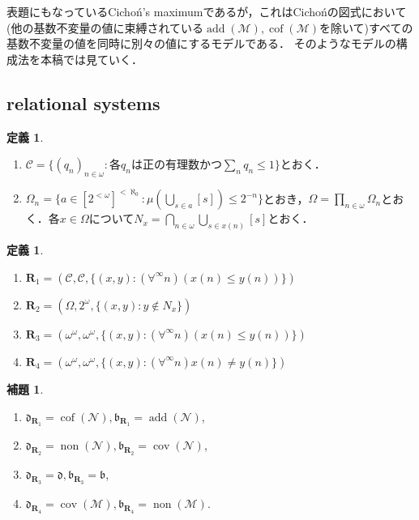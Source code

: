 \documentclass[uplatex,dvipdfmx]{jsarticle}
\newcommand{\non}{\operatorname{non}}
\newcommand{\cov}{\operatorname{cov}}
\newcommand{\add}{\operatorname{add}}
\newcommand{\cof}{\operatorname{cof}}
\newcommand{\nul}{\mathcal{N}}
\newcommand{\meager}{\mathcal{M}}
\newcommand{\frakb}{\mathfrak{b}}
\newcommand{\frakd}{\mathfrak{d}}
\newcommand{\relR}{\mathbf{R}}
\theoremstyle{definition}
\newtheorem{defi}[thm]{定義}
\newtheorem{lem}[thm]{補題}
\begin{document}
	表題にもなっているCichoń's maximumであるが，これはCichońの図式において (他の基数不変量の値に束縛されている$\add(\meager), \cof(\meager)$を除いて)すべての基数不変量の値を同時に別々の値にするモデルである．
	そのようなモデルの構成法を本稿では見ていく．
	
	\subsection{relational systems}
	
	\begin{defi}
		\begin{enumerate}
			\item $\mathcal{C} = \{ (q_n)_{n \in \omega}	 : \text{各}q_n\text{は正の有理数かつ} \sum_n q_n \le 1 \}$とおく．
			\item $\Omega_n = \{ a \in [2^{<\omega}]^{<\aleph_0} : \mu(\bigcup_{s \in a} [s]) \le 2^{-n} \}$とおき，$\Omega = \prod_{n \in \omega} \Omega_n$とおく．各$x \in \Omega$について$N_x = \bigcap_{n \in \omega} \bigcup_{s \in x(n)} [s]$とおく．
		\end{enumerate}
	\end{defi}
	
	\begin{defi}
		\begin{enumerate}
			\item $\relR_1 = (\mathcal{C}, \mathcal{C}, \{(x,y) : (\forall^\infty n) (x(n) \le y(n))\})$
			\item $\relR_2 = (\Omega, 2^\omega, \{ (x, y) : y \not \in N_x \})$
			\item $\relR_3 = (\omega^\omega, \omega^\omega, \{ (x,y) : (\forall^\infty n)(x(n) \le y(n))\})$
			\item $\relR_4 = (\omega^\omega, \omega^\omega, \{ (x,y) : (\forall^\infty n) x(n) \ne y(n) \})$
		\end{enumerate}
	\end{defi}

	\begin{lem}
		\begin{enumerate}
			\item $\frakd_{\relR_1} = \cof(\nul), \frakb_{\relR_1} = \add(\nul)$,
			\item $\frakd_{\relR_2} = \non(\nul), \frakb_{\relR_2} = \cov(\nul)$,
			\item $\frakd_{\relR_3} = \frakd, \frakb_{\relR_3} = \frakb$,
			\item $\frakd_{\relR_4} = \cov(\meager), \frakb_{\relR_4} = \non(\meager)$.
		\end{enumerate}
	\end{lem}
	
\end{document}
